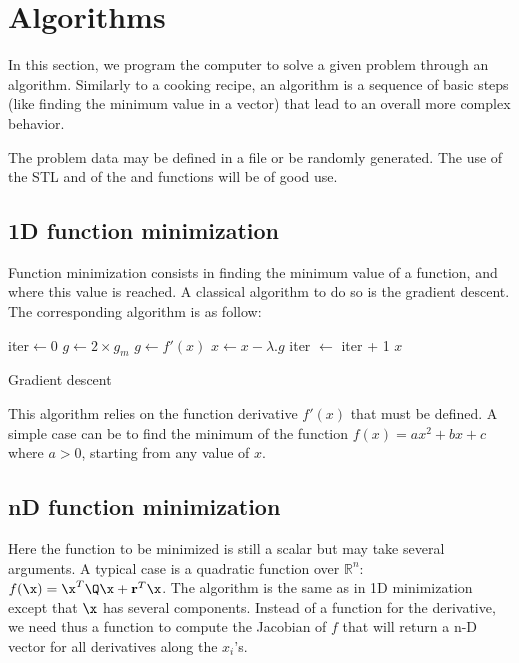 \documentclass{ecnreport}
\begin{document}
\newpage

\section{Algorithms}

In this section, we program the computer to solve a given problem through an algorithm. Similarly to a cooking recipe, an algorithm is a sequence of basic steps (like finding the minimum value in a vector) that lead to an overall more complex behavior.

The problem data may be defined in a file or be randomly generated.
The use of the STL and of the  and  functions will be of good use.

\subsection{1D function minimization}

Function minimization consists in finding the minimum value of a function, and where this value is reached. A classical algorithm to do so is the gradient descent. The corresponding algorithm is as follow:

\begin{algorithm}[!h]
{}
iter$\gets$0\;
$g\gets2\times g_m$\;
{
$g\gets f'(x)$\;
$x\gets x - \lambda.g$\;
iter $\gets$ iter + 1\;
}
\Return $x$\;
\caption{Gradient descent}
\label{algo:grad}
\end{algorithm}

This algorithm relies on the function derivative $f'(x)$ that must be defined. A simple case can be to find the minimum of the function $f(x) = ax^2+bx+c$ where $a>0$, starting from any value of $x$.

\begin{itemize}
 \end{itemize}
 
\subsection{nD function minimization}

Here the function to be minimized is still a scalar but may take several arguments. A typical case is a quadratic function over $\mathbb{R}^n$: $f(\x) = \x^T\Q\x + \mathbf{r}^T\x$. The algorithm is the same as in 1D minimization except that $\x$ has several components. Instead of a function for the derivative, we need thus a function to compute the Jacobian of $f$ that will return a n-D vector for all derivatives along the $x_i$'s. 
\end{document}
